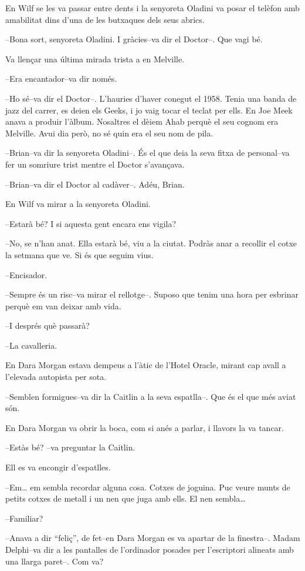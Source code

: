 En Wilf se les va passar entre dents i la senyoreta Oladini va posar el
telèfon amb amabilitat dins d'una de les butxaques dels seus abrics.

--Bona sort, senyoreta Oladini. I gràcies--va dir el Doctor--. Que vagi
bé.

Va llençar una última mirada trista a en Melville.

--Era encantador--va dir només.

--Ho sé--va dir el Doctor--. L'hauries d'haver conegut el 1958. Tenia
una banda de jazz del carrer, es deien els Geeks, i jo vaig tocar el
teclat per ells. En Joe Meek anava a produir l'àlbum. Nosaltres el dèiem
Ahab perquè el seu cognom era Melville. Avui dia però, no sé quin era el
seu nom de pila.

--Brian--va dir la senyoreta Oladini--. És el que deia la seva fitxa de
personal--va fer un somriure trist mentre el Doctor s'avançava.

--Brian--va dir el Doctor al cadàver--. Adéu, Brian.

En Wilf va mirar a la senyoreta Oladini.

--Estarà bé? I si aquesta gent encara ens vigila?

--No, se n'han anat. Ella estarà bé, viu a la ciutat. Podràs anar a
recollir el cotxe la setmana que ve. Si és que seguim vius.

--Encisador.

--Sempre és un risc--va mirar el rellotge--. Suposo que tenim una hora
per esbrinar perquè em van deixar amb vida.

--I després què passarà?

--La cavalleria.

En Dara Morgan estava dempeus a l'àtic de l'Hotel Oracle, mirant cap
avall a l'elevada autopista per sota.

--Semblen formigues--va dir la Caitlin a la seva espatlla--. Que és el
que més aviat són.

En Dara Morgan va obrir la boca, com si anés a parlar, i llavors la va
tancar.

--Estàs bé? --va preguntar la Caitlin.

Ell es va encongir d'espatlles.

--Em\ldots{} em sembla recordar alguna cosa. Cotxes de joguina. Puc
veure munts de petits cotxes de metall i un nen que juga amb ells. El
nen sembla\ldots{}

--Familiar?

--Anava a dir ``feliç'', de fet--en Dara Morgan es va apartar de la
finestra--. Madam Delphi--va dir a les pantalles de l'ordinador posades
per l'escriptori alineats amb una llarga paret--. Com va?

